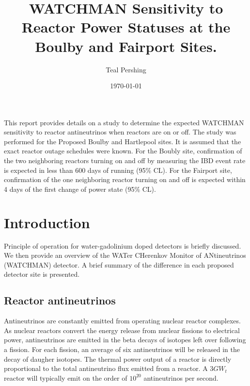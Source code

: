 \documentclass{article}
\title{WATCHMAN Sensitivity to Reactor Power Statuses at the Boulby and
Fairport Sites.}
\author{Teal Pershing}
\date{\today}
\begin{document}
\maketitle %

This report provides details on a study to determine the expected WATCHMAN
sensitivity to reactor antineutrinos when reactors are on or off.  The study
was performed for the Proposed Boulby and Hartlepool sites. It is assumed that
the exact reactor outage schedules were known.  For the Boubly site, confirmation
of the two neighboring reactors turning on and off by measuring the IBD event 
rate is expected in
less than 600 days of running (95\% CL).  For the Fairport site, confirmation of the one
neighboring reactor turning on and off is expected within 4 days of the first
change of power state (95\% CL).


\section{Introduction}

Principle of operation for water-gadolinium doped detectors is briefly discussed.
We then provide an overview of the WATer CHerenkov Monitor of ANtineutrinos 
(WATCHMAN) detector.  A brief summary of the difference in each proposed detector
site is presented.

\subsection{Reactor antineutrinos}

Antineutrinos are constantly emitted from operating nuclear reactor complexes.
As nuclear reactors convert the energy release from nuclear fissions 
to electrical power, antineutrinos are emitted in the beta decays of 
isotopes left over following a fission. For each fission, an average of six
antineutrinos will be released in the decay of daugher isotopes.  The thermal
power output of a reactor is directly proportional to the total antineutrino
flux emitted from a reactor.  A $3GW_{t}$ reactor will typically emit on the
order of $10^{20}$ antineutrinos per second.
\end{document}
